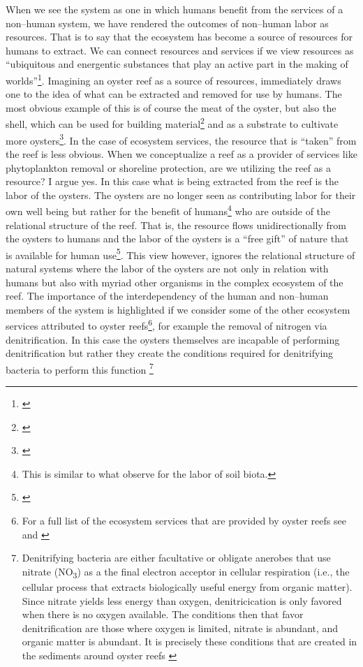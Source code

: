 \documentclass{article}
\begin{document}
{When we see the system as one in which humans benefit from the services of a non--human system, we have rendered the outcomes of non--human labor as resources. That is to say that the ecosystem has become a source of resources for humans to extract. We can connect resources and services if we view resources as ``ubiquitous and energentic substances that play an active part in the making of worlds''\footnote{\cite[p. 6]{richardson_introduction_2014}}. Imagining an oyster reef as a source of resources, immediately draws one to the idea of what can be extracted and removed for use by humans. The most obvious example of this is of course the meat of the oyster, but also the shell, which can be used for building material\footnote{\cite{}} and as a substrate to cultivate more oysters\footnote{\cite{}}. In the case of ecosystem services, the resource that is ``taken'' from the reef is less obvious. When we conceptualize a reef as a provider of services like phytoplankton removal or shoreline protection, are we utilizing the reef as a resource? I argue yes. In this case what is being extracted from the reef is the labor of the oysters. The oysters are no longer seen as contributing labor for their own well being but rather for the benefit of humans\footnote{This is similar to what  observe for the labor of soil biota.} who are outside of the relational structure of the reef. That is, the resource flows unidirectionally from the oysters to humans and the labor of the oysters is a ``free gift'' of nature that is available for human use\footnote{\cite{richardson_introduction_2014, battistoni_bringing_2017}}. This view however, ignores the relational structure of natural systems where the labor of the oysters are not only in relation with humans but also with myriad other organisms in the complex ecosystem of the reef. The importance of the interdependency of the human and non--human members of the system is highlighted if we consider some of the other ecosystem services attributed to oyster reefs\footnote{For a full list of the ecosystem services that are provided by oyster reefs see \cite{grabowski_economic_2012} and \cite{}}, for example the removal of nitrogen via denitrification. In this case the oysters themselves are incapable of performing denitrification but rather they create the conditions required for denitrifying bacteria to perform this function
\footnote{Denitrifying bacteria are either facultative or obligate anerobes that use nitrate (NO\textsubscript{3}) as a the final electron acceptor in cellular respiration (i.e., the cellular process that extracts biologically useful energy from organic matter). Since nitrate yields less energy than oxygen, denitricication is only favored when there is no oxygen available. The conditions then that favor denitrification are those where oxygen is limited, nitrate is abundant, and organic matter is abundant. It is precisely these conditions that are created in the sediments around oyster reefs \cite{smyth_assessing_2013}}
}
\end{document}
